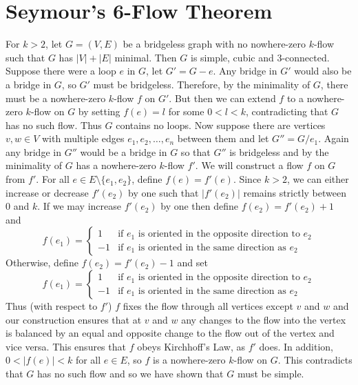 \chapter{Seymour's 6-Flow Theorem}

{\lem For $k > 2$, let $G = (V,E)$ be a bridgeless graph with no nowhere-zero $k$-flow such that $G$ has $|V|+|E|$ minimal. Then $G$ is simple, cubic and 3-connected.}\\

Suppose there were a loop $e$ in $G$, let $G' = G - e$. Any bridge in $G'$ would also be a bridge in $G$, so $G'$ must be bridgeless. Therefore, by the minimality of $G$, there must be a nowhere-zero $k$-flow $f$ on $G'$. But then we can extend $f$ to a nowhere-zero $k$-flow on $G$ by setting $f(e) = l$ for some $0 < l < k$, contradicting that $G$ has no such flow. Thus $G$ contains no loops. Now suppose there are vertices $v,w \in V$ with multiple edges $e_1, e_2, \ldots, e_n$ between them and let $G'' = G/e_1$. Again any bridge in $G''$ would be a bridge in $G$ so that $G''$ is bridgeless and by the minimality of $G$ has a nowhere-zero $k$-flow $f'$. We will construct a flow $f$ on $G$ from $f'$. For all $e \in E \setminus \{e_1,e_2\}$, define $f(e)=f'(e)$. Since $k > 2$, we can either increase or decrease $f'(e_2)$ by one such that $|f'(e_2)|$ remains strictly between $0$ and $k$. If we may increase $f'(e_2)$ by one then define $f(e_2) = f'(e_2) + 1$ and
$$f(e_1) = \begin{cases} 1 & \text{if $e_1$ is oriented in the opposite direction to $e_2$} \\ -1 & \text{if $e_1$ is oriented in the same direction as $e_2$} \end{cases} $$
Otherwise, define $f(e_2) = f'(e_2) - 1$ and set
$$f(e_1) = \begin{cases} 1 & \text{if $e_1$ is oriented in the opposite direction to $e_2$} \\ -1 & \text{if $e_1$ is oriented in the same direction as $e_2$} \end{cases} $$
Thus (with respect to $f'$) $f$ fixes the flow through all vertices except $v$ and $w$ and our construction ensures that at $v$ and $w$ any changes to the flow into the vertex is balanced by an equal and opposite change to the flow out of the vertex and vice versa. This ensures that $f$ obeys Kirchhoff's Law, as $f'$ does. In addition, $0 < |f(e)| < k$ for all $e \in E$, so $f$ is a nowhere-zero $k$-flow on $G$. This contradicts that $G$ has no such flow and so we have shown that $G$ must be simple.


